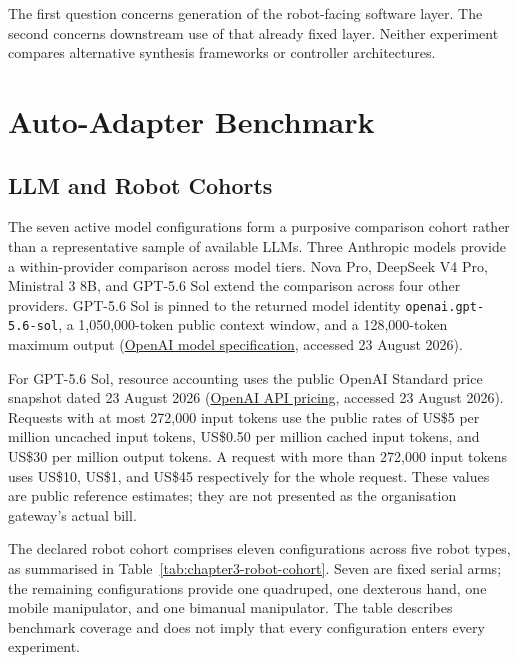 The first question concerns generation of the robot-facing software layer. The
second concerns downstream use of that already fixed layer. Neither experiment
compares alternative synthesis frameworks or controller architectures.

\section[Auto-Adapter Benchmark]{Auto-Adapter Benchmark}

\subsection{LLM and Robot Cohorts}

The seven active model configurations form a purposive comparison cohort
rather than a representative sample of available LLMs. Three Anthropic models
provide a within-provider comparison across model tiers. Nova Pro, DeepSeek V4
Pro, Ministral 3 8B, and GPT-5.6 Sol extend the comparison across four other
providers. GPT-5.6 Sol is pinned to the returned model identity
\texttt{openai.gpt-5.6-sol}, a 1,050,000-token public context window, and a
128,000-token maximum output
(\href{https://developers.openai.com/api/docs/models/gpt-5.6-sol}{OpenAI model
specification}, accessed 23 August 2026).

For GPT-5.6 Sol, resource accounting uses the public OpenAI Standard price snapshot
dated 23 August 2026
(\href{https://platform.openai.com/pricing}{OpenAI API pricing}, accessed
23 August 2026). Requests
with at most 272,000 input tokens use the public
rates of US\$5 per million uncached input tokens, US\$0.50 per million cached
input tokens, and US\$30 per million output tokens. A request with more than
272,000 input tokens uses US\$10, US\$1, and US\$45 respectively for the whole
request. These values are public reference estimates; they are not presented as
the organisation gateway's actual bill.

The declared robot cohort comprises eleven configurations across five robot
types, as summarised in Table~\ref{tab:chapter3-robot-cohort}. Seven are fixed
serial arms; the remaining configurations provide one quadruped, one
dexterous hand, one mobile manipulator, and one bimanual manipulator. The table
describes benchmark coverage and does not imply that every configuration
enters every experiment.


